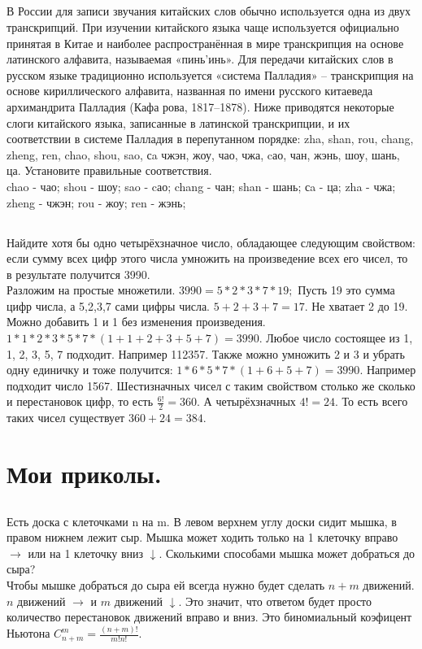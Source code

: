 \documentclass[a4paper,12pt]{article} %
\begin{document}
	\subsection{}{В России для записи звучания китайских слов обычно используется одна из двух транскрипций. При изучении китайского языка чаще используется официально принятая в Китае и наиболее распространённая в мире транскрипция на основе латинского алфавита, называемая «пинь’инь». Для передачи китайских слов в русском языке традиционно используется «система Палладия» – транскрипция на основе кириллического алфавита, названная по имени русского китаеведа архимандрита Палладия (Кафа рова, 1817–1878). Ниже приводятся некоторые слоги китайского языка, записанные в латинской транскрипции, и их соответствии в системе Палладия в перепутанном порядке: zha, shan, rou, chang, zheng, ren, chao, shou, sao, сa чжэн, жоу, чао, чжа, cао, чан, жэнь, шоу, шань, ца. Установите правильные соответствия.\\
		
		chao - чао; shou - шоу; sao - cао; chang - чан; shan - шань; сa - ца; zha - чжа; zheng - чжэн; rou - жоу; ren - жэнь;
	}
	
	\subsection{}{Найдите хотя бы одно четырёхзначное число, обладающее следующим свойством: если сумму всех цифр этого числа умножить на произведение всех его чисел, то в результате получится 3990.\\
		
		Разложим на простые множетили. $3990 = 5*2*3*7*19;$ Пусть 19 это сумма цифр числа, а 5,2,3,7 сами цифры числа. $5+2+3+7 = 17$. Не хватает 2 до 19. Можно добавить 1 и 1 без изменения произведения.
		$1*1*2*3*5*7*(1+1+2+3+5+7) = 3990$. Любое число состоящее из 1, 1, 2, 3, 5, 7 подходит. Например 112357. Также можно умножить 2 и 3 и убрать одну единичку и тоже получится: $1*6*5*7*(1+6+5+7) = 3990$. Например подходит число 1567. Шестизначных чисел с таким свойством столько же сколько и перестановок цифр, то есть $\frac{6!}{2}=360$. А четырёхзначных $4!=24$. То есть всего таких чисел существует $360+24=384$. 
	}
	
	\newpage
	\section{Мои приколы.}
	
	\subsection{}{Есть доска с клеточками n на m. В левом верхнем углу доски сидит мышка, в правом нижнем лежит сыр. Мышка может ходить только на 1 клеточку вправо $\rightarrow$ или на 1 клеточку вниз $\downarrow$. Сколькими способами мышка может добраться до сыра?\\
		
		Чтобы мышке добраться до сыра ей всегда нужно будет сделать $n+m$ движений. $n$ движений $\rightarrow$ и $m$ движений $\downarrow$. Это значит, что ответом будет просто количество перестановок движений вправо и вниз. Это биномиальный коэфицент Ньютона $C_{n+m}^{m} = \frac{(n+m)!}{m!n!}$.
	}
	
\end{document}
